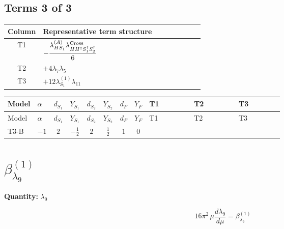 \documentclass[8pt]{article}
\begin{document}
\begin{landscape}
\subsection*{Terms 3 of 3}
\begin{center}
\begin{tabular}{@{}c >{\raggedright\arraybackslash}p{0.82\linewidth}@{}}
\toprule
Column & Representative term structure \\
\midrule
T1 & \(\displaystyle -\frac{{\lambda_{HS_1}^{(A)}} {\lambda_{H H^\dagger S_1^\dagger S_2^\dagger}^{\rm Cross}}}{6}\) \\
\midrule
T2 & \(\displaystyle +4 {\lambda_{7}} {\lambda_5}\) \\
\midrule
T3 & \(\displaystyle +12 {\lambda_{S_1}^{(1)}} {\lambda_{11}}\) \\
\midrule
\bottomrule
\end{tabular}
\end{center}
\smallskip
\tiny
\begin{longtable}{@{}llcccccc >{\raggedright\arraybackslash}p{0.21\linewidth} >{\raggedright\arraybackslash}p{0.21\linewidth} >{\raggedright\arraybackslash}p{0.21\linewidth}@{}}
\toprule
Model & $\alpha$ & $d_{S_1}$ & $Y_{S_1}$ & $d_{S_2}$ & $Y_{S_2}$ & $d_F$ & $Y_F$ & T1 & T2 & T3 \\
\midrule
\endfirsthead
\toprule
Model & $\alpha$ & $d_{S_1}$ & $Y_{S_1}$ & $d_{S_2}$ & $Y_{S_2}$ & $d_F$ & $Y_F$ & T1 & T2 & T3 \\
\midrule
\endhead
T3-B & $-1$ & $2$ & $-\frac{1}{2}$ & $2$ & $\frac{1}{2}$ & $1$ & $0$ & \scriptsize\adjustbox{max width=\linewidth}{$\begin{gathered} -\frac{{\lambda_{HS_1}^{(A)}} {\lambda_{H H^\dagger S_1^\dagger S_2^\dagger}^{\rm Cross}}}{6}\end{gathered}$} & \scriptsize\adjustbox{max width=\linewidth}{$\begin{gathered} +4 {\lambda_{7}} {\lambda_5}\end{gathered}$} & \scriptsize\adjustbox{max width=\linewidth}{$\begin{gathered} +12 {\lambda_{S_1}^{(1)}} {\lambda_{11}}\end{gathered}$} \\
\midrule
\bottomrule
\end{longtable}
\clearpage
\section*{$\beta_{\lambda_{9}}^{(1)}$}
\noindent\textbf{Quantity: }$\lambda_{9}$\par\smallskip
\[16\pi^2\,\mu\frac{d \lambda_{9}}{d\mu}=\beta_{\lambda_{9}}^{(1)}\]

\end{landscape}
\end{document}
